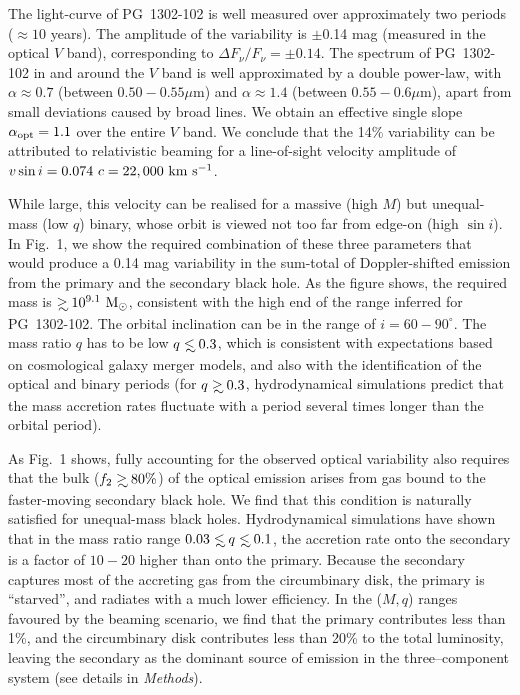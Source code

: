 The light-curve of PG~1302-102 is well measured over approximately two
periods ($\approx 10$ years).  The amplitude of the variability is
$\pm$0.14 mag (measured in the optical $V$
band\cite{Djorgovski+2010}), corresponding to $\Delta
F_\nu/F_\nu=\pm0.14$.  The spectrum of PG~1302-102 in and around the
$V$ band is well approximated by a double power-law, with
$\alpha\approx 0.7$ (between $0.50-0.55\mu$m) and $\alpha\approx 1.4$
(between $0.55-0.6\mu$m), apart from small deviations caused by broad
lines.  We obtain an effective single slope $\alpha_{\rm opt}=1.1$
over the entire $V$ band.  We conclude that the 14\% variability can
be attributed to relativistic beaming for a line-of-sight velocity
amplitude of $v\sin i=0.074~c=22,000~{\rm km~s^{-1}}$.

While large, this velocity can be realised for a massive (high $M$)
but unequal-mass (low $q$) binary, whose orbit is viewed not too far
from edge-on (high $\sin i$).  In Fig.~1, we show the required
combination of these three parameters that would produce a 0.14 mag
variability in the sum-total of Doppler-shifted emission from the
primary and the secondary black hole.  As the figure shows, the
required mass is $\gsim 10^{9.1}~{\rm M_\odot}$, consistent with the
high end of the range inferred for PG~1302-102.  The orbital
inclination can be in the range of $i=60-90^\circ$.  The mass ratio
$q$ has to be low $q\lsim 0.3$, which is consistent with expectations
based on cosmological galaxy merger models\cite{Volonteri+2003}, and
also with the identification of the optical and binary periods (for
$q\gsim 0.3$, hydrodynamical simulations predict that the mass
accretion rates fluctuate with a period several times longer than the
orbital period\cite{PG1302MNRAS:2015a}).

As Fig.~1 shows, fully accounting for the observed optical variability
also requires that the bulk ($f_2\gsim 80\%$) of the optical emission
arises from gas bound to the faster-moving secondary black hole. We
find that this condition is naturally satisfied for unequal-mass black
holes. Hydrodynamical simulations have shown that in the mass ratio
range $0.03\lsim q\lsim 0.1$, the accretion rate onto the secondary is
a factor of $10-20$ higher than onto the primary\cite{Farris:2014}.
Because the secondary captures most of the accreting gas from the
circumbinary disk, the primary is ``starved'', and radiates with a
much lower efficiency.  In the ($M,q$) ranges favoured by the beaming
scenario, we find that the primary contributes less than 1\%, and the
circumbinary disk contributes less than 20\% to the total luminosity,
leaving the secondary as the dominant source of emission in the
three--component system (see details in {\it Methods}).

